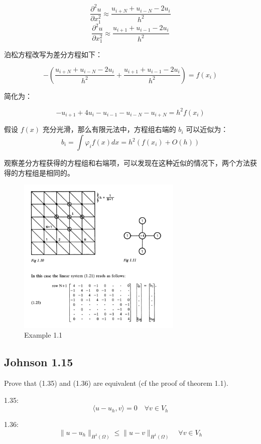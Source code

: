 \documentclass[UTF8]{ctexart}
\begin{document}
\[\frac{\partial^{2}u}{\partial x_{1}^{2}} \approx \frac{u_{i + N} + u_{i - N} - 2u_{i}}{h^{2}}\]
\[\frac{\partial^{2}u}{\partial x_{1}^{2}} \approx \frac{u_{i + 1} + u_{i - 1} - 2u_{i}}{h^{2}}\]

泊松方程改写为差分方程如下：

\[- \left( \frac{u_{i + N} + u_{i - N} - 2u_{i}}{h^{2}} + \frac{u_{i + 1} + u_{i - 1} - 2u_{i}}{h^{2}} \right) = f\left( x_{i} \right)\]

简化为：

\[- u_{i + 1} + 4u_{i} - u_{i - 1} - u_{i - N} - u_{i + N} = h^{2}f\left( x_{i} \right)\]

假设 \(f(x)\) 充分光滑，那么有限元法中，方程组右端的 \(b_{i}\)
可以近似为：
\[b_{i} = \int\varphi_{i}f(x)dx = h^{2}\left( f\left( x_{i} \right) + O(h) \right)\]

观察差分方程获得的方程组和右端项，可以发现在这种近似的情况下，两个方法获得的方程组是相同的。

\begin{figure}
\centering
\includegraphics[width=0.7\textwidth]{jh17.png}
\caption{Example 1.1}
\end{figure}

\subsection{Johnson 1.15}

Prove that (1.35) and (1.36) are equivalent (cf the proof of theorem
1.1).

1.35: \[
{{\langle u - u_{h},v\rangle} = 0\quad\forall v \in V_{h}}{}\]

1.36: \[
{\left. \parallel{u - u_{h}} \right.\parallel_{H^{1}(\Omega)} \leq \left. \parallel{u - v} \right.\parallel_{H^{1}(\Omega)}\quad\forall v \in V_{h}}{}\]
\end{document}
